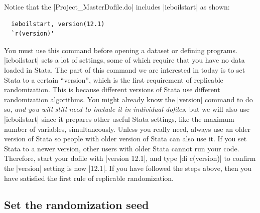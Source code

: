 \documentclass{tufte-handout}
\begin{document}
Notice that the |Project_MasterDofile.do| includes |ieboilstart| as shown:
\begin{Verbatim}
  ieboilstart, version(12.1)
  `r(version)'
\end{Verbatim}
You must use this command before opening a dataset or defining programs.
|ieboilstart| sets a lot of settings,
some of which require that you have no data loaded in Stata.
The part of this command we are interested in today is
to set Stata to a certain “version”,
which is the first requirement of replicable randomization.
This is because different versions of Stata use different randomization algorithms.
You might already know the |version| command to do so,
\textit{and you will still need to include it in individual dofiles},
but we will also use |ieboilstart| since it prepares
other useful Stata settings, like the maximum number of variables, simultaneously.
Unless you really need, always use an older version
of Stata so people with older version of Stata can also use it.
If you set Stata to a newer
version, other users with older Stata cannot run your code.
Therefore, start your dofile with |version 12.1|, and
type |di c(version)| to confirm the |version| setting is now |12.1|.
If you have followed the steps above,
then you have satisfied the first rule of replicable randomization.

\subsection{Set the randomization seed}
\end{document}
